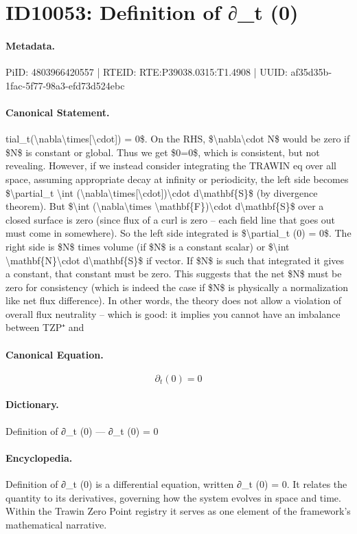 \section*{ID10053: Definition of ∂\_t (0)}
\paragraph{Metadata.}
PiID: 4803966420557 | RTEID: RTE:P39038.0315:T1.4908 | UUID: af35d35b-1fac-5f77-98a3-efd73d524ebc

\paragraph{Canonical Statement.}
tial\_t(\textbackslash{}nabla\textbackslash{}times[\textbackslash{}cdot]) = 0\$. On the RHS, \$\textbackslash{}nabla\textbackslash{}cdot N\$ would be zero if \$N\$ is constant or global. Thus we get \$0=0\$, which is consistent, but not revealing. However, if we instead consider integrating the TRAWIN eq over all space, assuming appropriate decay at infinity or periodicity, the left side becomes \$\textbackslash{}partial\_t \textbackslash{}int (\textbackslash{}nabla\textbackslash{}times[\textbackslash{}cdot])\textbackslash{}cdot d\textbackslash{}mathbf\{S\}\$ (by divergence theorem). But \$\textbackslash{}int (\textbackslash{}nabla\textbackslash{}times \textbackslash{}mathbf\{F\})\textbackslash{}cdot d\textbackslash{}mathbf\{S\}\$ over a closed surface is zero (since flux of a curl is zero – each field line that goes out must come in somewhere). So the left side integrated is \$\textbackslash{}partial\_t (0) = 0\$. The right side is \$N\$ times volume (if \$N\$ is a constant scalar) or \$\textbackslash{}int \textbackslash{}mathbf\{N\}\textbackslash{}cdot d\textbackslash{}mathbf\{S\}\$ if vector. If \$N\$ is such that integrated it gives a constant, that constant must be zero. This suggests that the net \$N\$ must be zero for consistency (which is indeed the case if \$N\$ is physically a normalization like net flux difference). In other words, the theory does not allow a violation of overall flux neutrality – which is good: it implies you cannot have an imbalance between TZP⁺ and

\paragraph{Canonical Equation.}
\[
\partial_t (0) = 0
\]

\paragraph{Dictionary.}
Definition of ∂\_t (0) — ∂\_t (0) = 0

\paragraph{Encyclopedia.}
Definition of ∂\_t (0) is a differential equation, written ∂\_t (0) = 0. It relates the quantity to its derivatives, governing how the system evolves in space and time. Within the Trawin Zero Point registry it serves as one element of the framework's mathematical narrative.
